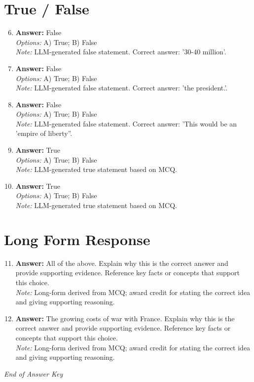 \documentclass[12pt]{article}
\begin{document}
\section*{True / False}
\begin{enumerate}[label=\arabic*.]
\setcounter{enumi}{5}
\item \textbf{Answer:} False
\\ \textit{Options:} A) True; B) False
\\ \textit{Note:} LLM-generated false statement. Correct answer: '30-40 million'.
\item \textbf{Answer:} False
\\ \textit{Options:} A) True; B) False
\\ \textit{Note:} LLM-generated false statement. Correct answer: 'the president.'.
\item \textbf{Answer:} False
\\ \textit{Options:} A) True; B) False
\\ \textit{Note:} LLM-generated false statement. Correct answer: 'This would be an 'empire of liberty''.
\item \textbf{Answer:} True
\\ \textit{Options:} A) True; B) False
\\ \textit{Note:} LLM-generated true statement based on MCQ.
\item \textbf{Answer:} True
\\ \textit{Options:} A) True; B) False
\\ \textit{Note:} LLM-generated true statement based on MCQ.
\end{enumerate}

\section*{Long Form Response}
\begin{enumerate}[label=\arabic*.]
\setcounter{enumi}{10}
\item \textbf{Answer:} All of the above. Explain why this is the correct answer and provide supporting evidence. Reference key facts or concepts that support this choice.
\\ \textit{Note:} Long-form derived from MCQ; award credit for stating the correct idea and giving supporting reasoning.
\item \textbf{Answer:} The growing costs of war with France. Explain why this is the correct answer and provide supporting evidence. Reference key facts or concepts that support this choice.
\\ \textit{Note:} Long-form derived from MCQ; award credit for stating the correct idea and giving supporting reasoning.
\end{enumerate}

\vfill
\noindent\textit{End of Answer Key}
\end{document}
